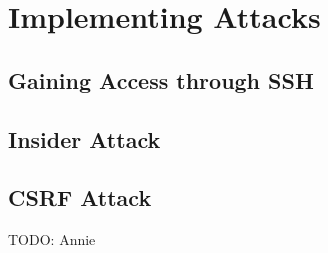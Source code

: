 \section{Implementing Attacks}
\label{sec:implementattacks}

\subsection{Gaining Access through SSH}

\subsection{Insider Attack}

\subsection{CSRF Attack}

TODO: Annie
